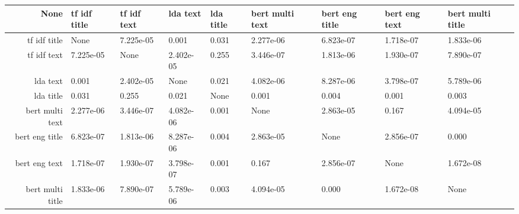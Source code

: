 \begin{tabular}{|r|l|l|l|l|l|l|l|l|}
  \hline
  None & tf idf title & tf idf text & lda text & lda title & bert multi text & bert eng title & bert eng text & bert multi title \\ 
  \hline
  tf idf title & None & 7.225e-05 & 0.001 & 0.031 & 2.277e-06 & 6.823e-07 & 1.718e-07 & 1.833e-06 \\ 
  \hline
  tf idf text & 7.225e-05 & None & 2.402e-05 & 0.255 & 3.446e-07 & 1.813e-06 & 1.930e-07 & 7.890e-07 \\ 
  \hline
  lda text & 0.001 & 2.402e-05 & None & 0.021 & 4.082e-06 & 8.287e-06 & 3.798e-07 & 5.789e-06 \\ 
  \hline
  lda title & 0.031 & 0.255 & 0.021 & None & 0.001 & 0.004 & 0.001 & 0.003 \\ 
  \hline
  bert multi text & 2.277e-06 & 3.446e-07 & 4.082e-06 & 0.001 & None & 2.863e-05 & 0.167 & 4.094e-05 \\ 
  \hline
  bert eng title & 6.823e-07 & 1.813e-06 & 8.287e-06 & 0.004 & 2.863e-05 & None & 2.856e-07 & 0.000 \\ 
  \hline
  bert eng text & 1.718e-07 & 1.930e-07 & 3.798e-07 & 0.001 & 0.167 & 2.856e-07 & None & 1.672e-08 \\ 
  \hline
  bert multi title & 1.833e-06 & 7.890e-07 & 5.789e-06 & 0.003 & 4.094e-05 & 0.000 & 1.672e-08 & None \\ 
  \hline
\end{tabular}
